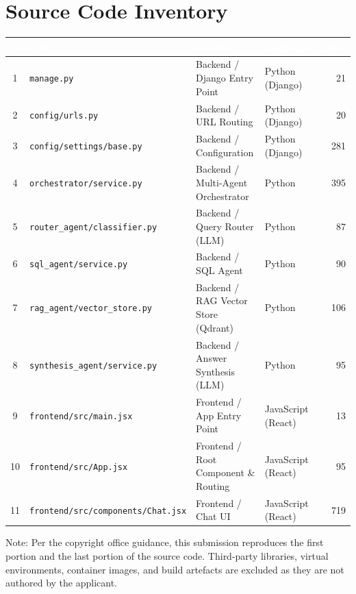 \documentclass[11pt,a4paper]{article}
\begin{document}
\section*{Source Code Inventory}

\renewcommand{\arraystretch}{1.3}
\begin{tabularx}{\linewidth}{|c|>{\raggedright\arraybackslash}p{5.3cm}|X|p{2.6cm}|r|}
\hline
\rowcolor{hdrnavy}
\textcolor{white}{\bfseries \#} & \textcolor{white}{\bfseries File} &
\textcolor{white}{\bfseries Module} & \textcolor{white}{\bfseries Language} &
\textcolor{white}{\bfseries Lines} \\
\hline
1 & \nolinkurl{manage.py} & Backend / Django Entry Point & Python (Django) & 21 \\
\hline
2 & \nolinkurl{config/urls.py} & Backend / URL Routing & Python (Django) & 20 \\
\hline
3 & \nolinkurl{config/settings/base.py} & Backend / Configuration & Python (Django) & 281 \\
\hline
4 & \nolinkurl{orchestrator/service.py} & Backend / Multi-Agent Orchestrator & Python & 395 \\
\hline
5 & \nolinkurl{router_agent/classifier.py} & Backend / Query Router (LLM) & Python & 87 \\
\hline
6 & \nolinkurl{sql_agent/service.py} & Backend / SQL Agent & Python & 90 \\
\hline
7 & \nolinkurl{rag_agent/vector_store.py} & Backend / RAG Vector Store (Qdrant) & Python & 106 \\
\hline
8 & \nolinkurl{synthesis_agent/service.py} & Backend / Answer Synthesis (LLM) & Python & 95 \\
\hline
9 & \nolinkurl{frontend/src/main.jsx} & Frontend / App Entry Point & JavaScript (React) & 13 \\
\hline
10 & \nolinkurl{frontend/src/App.jsx} & Frontend / Root Component \& Routing & JavaScript (React) & 95 \\
\hline
11 & \nolinkurl{frontend/src/components/Chat.jsx} & Frontend / Chat UI & JavaScript (React) & 719 \\
\hline
\end{tabularx}

\vspace{0.8em}
\noindent\small Note: Per the copyright office guidance, this submission
reproduces the first portion and the last portion of the source code.
Third-party libraries, virtual environments, container images, and build
artefacts are excluded as they are not authored by the applicant.
\end{document}
